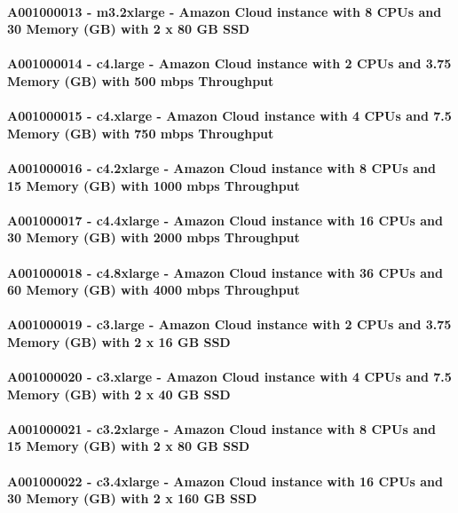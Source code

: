\documentclass{acm_proc_article-sp}
\begin{document}
\paragraph{A001000013 - m3.2xlarge - Amazon Cloud instance with 8 CPUs and 30 Memory (GB) with 2 x 80 GB SSD}
\paragraph{A001000014 - c4.large - Amazon Cloud instance with 2 CPUs and 3.75 Memory (GB) with 500 mbps Throughput}
\paragraph{A001000015 - c4.xlarge - Amazon Cloud instance with 4 CPUs and 7.5 Memory (GB) with 750 mbps Throughput}
\paragraph{A001000016 - c4.2xlarge - Amazon Cloud instance with 8 CPUs and 15 Memory (GB) with 1000 mbps Throughput}
\paragraph{A001000017 - c4.4xlarge - Amazon Cloud instance with 16 CPUs and 30 Memory (GB) with 2000 mbps Throughput}
\paragraph{A001000018 - c4.8xlarge - Amazon Cloud instance with 36 CPUs and 60 Memory (GB) with 4000 mbps Throughput}
\paragraph{A001000019 - c3.large - Amazon Cloud instance with 2 CPUs and 3.75 Memory (GB) with 2 x 16 GB SSD}
\paragraph{A001000020 - c3.xlarge - Amazon Cloud instance with 4 CPUs and 7.5 Memory (GB) with 2 x 40 GB SSD}
\paragraph{A001000021 - c3.2xlarge - Amazon Cloud instance with 8 CPUs and 15 Memory (GB) with 2 x 80 GB SSD}
\paragraph{A001000022 - c3.4xlarge - Amazon Cloud instance with 16 CPUs and 30 Memory (GB) with 2 x 160 GB SSD}
\end{document}
